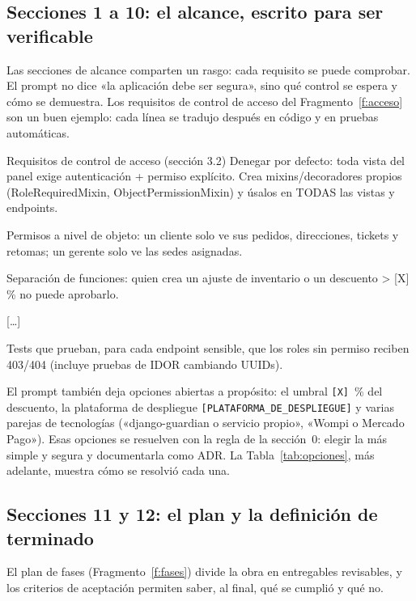 \documentclass[stu,12pt,floatsintext]{apa7}
\newcommand{\ruta}[1]{{\urlstyle{tt}\nolinkurl{#1}}}
\begin{document}
\subsection{Secciones 1 a 10: el alcance, escrito para ser verificable}

Las secciones de alcance comparten un rasgo: cada requisito se puede comprobar. El prompt no dice «la
aplicación debe ser segura», sino qué control se espera y cómo se demuestra. Los requisitos de control
de acceso del Fragmento~\ref{f:acceso} son un buen ejemplo: cada línea se tradujo después en código y en
pruebas automáticas.

\begin{fragmento}[label=f:acceso]{Requisitos de control de acceso (sección 3.2)}
Denegar por defecto: toda vista del panel exige autenticación + permiso explícito. Crea
mixins/decoradores propios (RoleRequiredMixin, ObjectPermissionMixin) y úsalos en TODAS las vistas y
endpoints.

Permisos a nivel de objeto: un cliente solo ve sus pedidos, direcciones, tickets y retomas; un gerente
solo ve las sedes asignadas.

Separación de funciones: quien crea un ajuste de inventario o un descuento > [X] \% no puede aprobarlo.

[…]

Tests que prueban, para cada endpoint sensible, que los roles sin permiso reciben 403/404 (incluye
pruebas de IDOR cambiando UUIDs).
\end{fragmento}

El prompt también deja opciones abiertas a propósito: el umbral \texttt{[X]}~\% del descuento, la
plataforma de despliegue \ruta{[PLATAFORMA_DE_DESPLIEGUE]} y varias parejas de tecnologías
(«django-guardian o servicio propio», «Wompi o Mercado Pago»). Esas opciones se resuelven con la regla
de la sección~0: elegir la más simple y segura y documentarla como ADR. La Tabla~\ref{tab:opciones}, más
adelante, muestra cómo se resolvió cada una.

\subsection{Secciones 11 y 12: el plan y la definición de terminado}

El plan de fases (Fragmento~\ref{f:fases}) divide la obra en entregables revisables, y los criterios de
aceptación permiten saber, al final, qué se cumplió y qué no.
\end{document}
